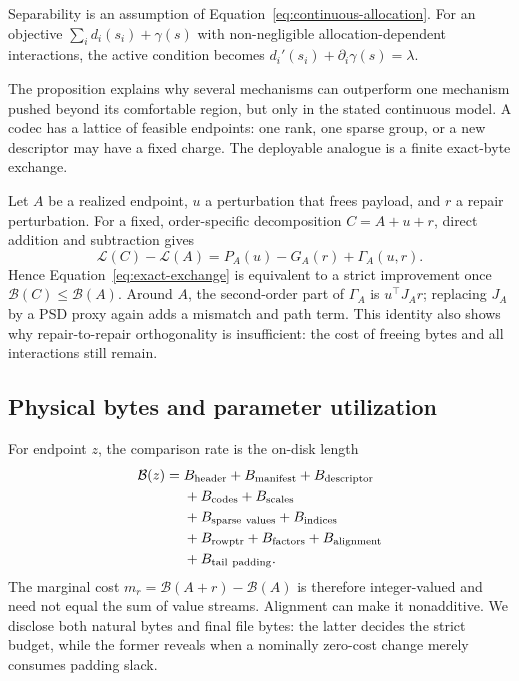 Separability is an assumption of Equation~\eqref{eq:continuous-allocation}.
For an objective $\sum_i d_i(s_i)+\gamma(s)$ with non-negligible
allocation-dependent interactions, the active condition becomes
$d_i'(s_i)+\partial_i\gamma(s)=\lambda$.

The proposition explains why several mechanisms can outperform one
mechanism pushed beyond its comfortable region, but only in the stated
continuous model.  A codec has a lattice of feasible endpoints: one
rank, one sparse group, or a new descriptor may have a fixed charge.
The deployable analogue is a finite exact-byte exchange.

Let $A$ be a realized endpoint, $u$ a perturbation that frees payload,
and $r$ a repair perturbation.  For a fixed, order-specific decomposition
$C=A+u+r$, direct addition and subtraction gives
\begin{equation}
\label{eq:exchange-identity}
\mathcal{L}(C)-\mathcal{L}(A)=P_A(u)-G_A(r)+\Gamma_A(u,r).
\end{equation}
Hence Equation~\eqref{eq:exact-exchange} is equivalent to a strict
improvement once $\mathcal{B}(C)\le\mathcal{B}(A)$.  Around $A$, the
second-order part of $\Gamma_A$ is $u^\top J_A r$; replacing $J_A$ by a
PSD proxy again adds a mismatch and path term.  This identity also shows
why repair-to-repair orthogonality is insufficient: the cost of freeing
bytes and all interactions still remain.

\subsection{Physical bytes and parameter utilization}

For endpoint $z$, the comparison rate is the on-disk length
\begin{equation}
\label{eq:byte-ledger}
\begin{split}
\mathcal{B}(z)={}&B_{\rm header}+B_{\rm manifest}+B_{\rm descriptor}\\
&+B_{\rm codes}+B_{\rm scales}\\
&+B_{\rm sparse\ values}+B_{\rm indices}\\
&+B_{\rm rowptr}+B_{\rm factors}+B_{\rm alignment}\\
&+B_{\rm tail\ padding}.
\end{split}
\end{equation}
The marginal cost $m_r=\mathcal{B}(A+r)-\mathcal{B}(A)$ is therefore
integer-valued and need not equal the sum of value streams.  Alignment
can make it nonadditive.  We disclose both natural bytes and final file
bytes: the latter decides the strict budget, while the former reveals
when a nominally zero-cost change merely consumes padding slack.

